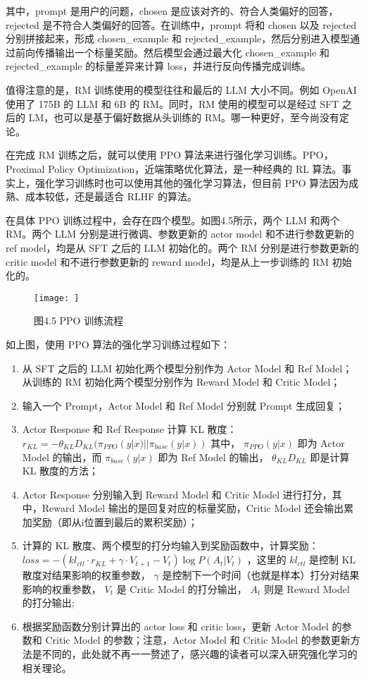 \documentclass[
]{article}
\providecommand{\tightlist}{%
  \setlength{\itemsep}{0pt}\setlength{\parskip}{0pt}}
\begin{document}
其中，prompt 是用户的问题，chosen
是应该对齐的、符合人类偏好的回答，rejected
是不符合人类偏好的回答。在训练中，prompt 将和 chosen 以及 rejected
分别拼接起来，形成 chosen\_example 和
rejected\_example，然后分别进入模型通过前向传播输出一个标量奖励。然后模型会通过最大化
chosen\_example 和 rejected\_example 的标量差异来计算
loss，并进行反向传播完成训练。

值得注意的是，RM 训练使用的模型往往和最后的 LLM 大小不同。例如 OpenAI
使用了 175B 的 LLM 和 6B 的 RM。同时，RM 使用的模型可以是经过 SFT 之后的
LM，也可以是基于偏好数据从头训练的 RM。哪一种更好，至今尚没有定论。

在完成 RM 训练之后，就可以使用 PPO 算法来进行强化学习训练。PPO，Proximal
Policy Optimization，近端策略优化算法，是一种经典的 RL
算法。事实上，强化学习训练时也可以使用其他的强化学习算法，但目前 PPO
算法因为成熟、成本较低，还是最适合 RLHF 的算法。

在具体 PPO 训练过程中，会存在四个模型。如图4.5所示，两个 LLM 和两个
RM。两个 LLM 分别是进行微调、参数更新的 actor model 和不进行参数更新的
ref model，均是从 SFT 之后的 LLM 初始化的。两个 RM 分别是进行参数更新的
critic model 和不进行参数更新的 reward model，均是从上一步训练的 RM
初始化的。

\begin{figure}[htbp]\centering
\texttt{[image: ]}
\caption{图4.5 PPO 训练流程}
\end{figure}

如上图，使用 PPO 算法的强化学习训练过程如下：

\begin{enumerate}
\def\labelenumi{\arabic{enumi}.}
\tightlist
\item
  从 SFT 之后的 LLM 初始化两个模型分别作为 Actor Model 和 Ref
  Model；从训练的 RM 初始化两个模型分别作为 Reward Model 和 Critic
  Model；
\item
  输入一个 Prompt，Actor Model 和 Ref Model 分别就 Prompt 生成回复；
\item
  Actor Response 和 Ref Response 计算 KL 散度：
  \(r_{KL} = -\theta_{KL}D_{KL}(\pi_{PPO}(y|x)||\pi_{base}(y|x))\)
  其中， \(\pi_{PPO}(y|x)\) 即为 Actor Model 的输出，而
  \(\pi_{base}(y|x)\) 即为 Ref Model 的输出， \(\theta_{KL}D_{KL}\)
  即是计算 KL 散度的方法；
\item
  Actor Response 分别输入到 Reward Model 和 Critic Model
  进行打分，其中，Reward Model 输出的是回复对应的标量奖励，Critic Model
  还会输出累加奖励（即从i位置到最后的累积奖励）；
\item
  计算的 KL 散度、两个模型的打分均输入到奖励函数中，计算奖励：
  \(loss = -(kl_{ctl} \cdot r_{KL} + \gamma \cdot V_{t+1} - V_{t}) \log P(A_t|V_t)\)
  ，这里的 \(kl_{ctl}\) 是控制 KL 散度对结果影响的权重参数， \(\gamma\)
  是控制下一个时间（也就是样本）打分对结果影响的权重参数， \(V_t\) 是
  Critic Model 的打分输出， \(A_t\) 则是 Reward Model 的打分输出;
\item
  根据奖励函数分别计算出的 actor loss 和 critic loss，更新 Actor Model
  的参数和 Critic Model 的参数；注意，Actor Model 和 Critic Model
  的参数更新方法是不同的，此处就不再一一赘述了，感兴趣的读者可以深入研究强化学习的相关理论。
\end{enumerate}
\end{document}
